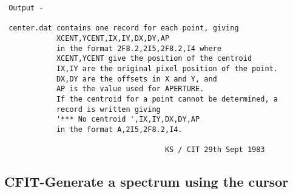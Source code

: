 \begin{description}
\begin{verbatim}
 Output -

 center.dat contains one record for each point, giving
            XCENT,YCENT,IX,IY,DX,DY,AP
            in the format 2F8.2,2I5,2F8.2,I4 where
            XCENT,YCENT give the position of the centroid
            IX,IY are the original pixel position of the point.
            DX,DY are the offsets in X and Y, and
            AP is the value used for APERTURE.
            If the centroid for a point cannot be determined, a
            record is written giving
            '*** No centroid ',IX,IY,DX,DY,AP
            in the format A,2I5,2F8.2,I4.

                                     KS / CIT 29th Sept 1983
\end{verbatim}
\end{description}
\subsection{CFIT-\label{CFIT}Generate a spectrum using the cursor}
